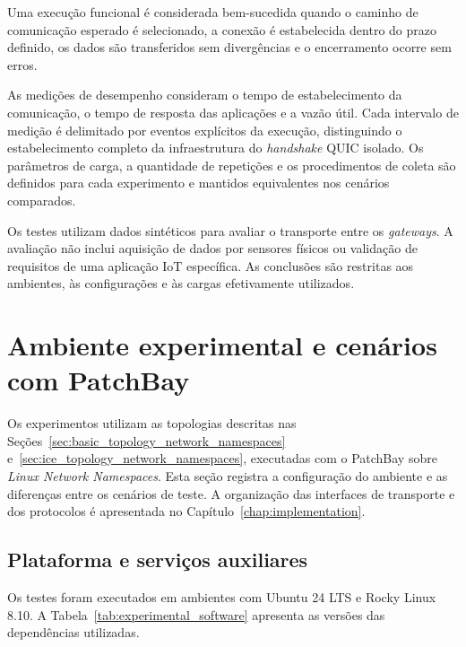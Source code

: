 Uma execução funcional é considerada bem-sucedida quando o caminho de comunicação esperado é selecionado, a conexão é estabelecida dentro do prazo definido, os dados são transferidos sem divergências e o encerramento ocorre sem erros. 

As medições de desempenho consideram o tempo de estabelecimento da comunicação, o tempo de resposta das aplicações e a vazão útil. Cada intervalo de medição é delimitado por eventos explícitos da execução, distinguindo o estabelecimento completo da infraestrutura do \textit{handshake} QUIC isolado. Os parâmetros de carga, a quantidade de repetições e os procedimentos de coleta são definidos para cada experimento e mantidos equivalentes nos cenários comparados.

Os testes utilizam dados sintéticos para avaliar o transporte entre os \textit{gateways}. A avaliação não inclui aquisição de dados por sensores físicos ou validação de requisitos de uma aplicação IoT específica. As conclusões são restritas aos ambientes, às configurações e às cargas efetivamente utilizados.

\section{Ambiente experimental e cenários com PatchBay}
\label{sec:experimental_patchbay}

Os experimentos utilizam as topologias descritas nas Seções~\ref{sec:basic_topology_network_namespaces}  e~\ref{sec:ice_topology_network_namespaces}, executadas com o PatchBay sobre \textit{Linux Network Namespaces}. Esta seção registra a configuração do ambiente e as diferenças entre os cenários de teste. A organização das interfaces de transporte e dos protocolos é apresentada no Capítulo~\ref{chap:implementation}.

\subsection{Plataforma e serviços auxiliares}

Os testes foram executados em ambientes com Ubuntu 24 LTS e Rocky Linux 8.10. A Tabela~\ref{tab:experimental_software} apresenta as versões das dependências utilizadas.

